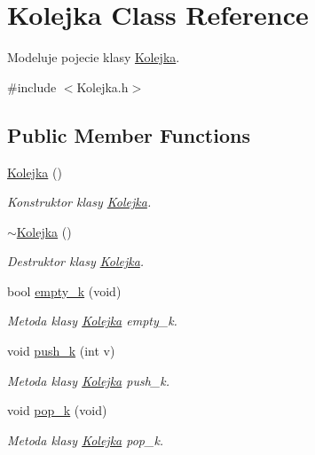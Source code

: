 \hypertarget{class_kolejka}{\section{Kolejka Class Reference}
\label{class_kolejka}
}


Modeluje pojecie klasy \hyperlink{class_kolejka}{Kolejka}.  




{\ttfamily \#include $<$Kolejka.\-h$>$}

\subsection*{Public Member Functions}
\begin{DoxyCompactItemize}
\item 
\hyperlink{class_kolejka_a37c886fdc73dce62b04da0381dec5484}{Kolejka} ()
\begin{DoxyCompactList}\small\item\em Konstruktor klasy \hyperlink{class_kolejka}{Kolejka}. \end{DoxyCompactList}\item 
\hyperlink{class_kolejka_a352f86ff08cd47be6c35c60bb0f873a6}{$\sim$\-Kolejka} ()
\begin{DoxyCompactList}\small\item\em Destruktor klasy \hyperlink{class_kolejka}{Kolejka}. \end{DoxyCompactList}\item 
bool \hyperlink{class_kolejka_a9a1de118b1444cf908563e703fcd2a9f}{empty\-\_\-k} (void)
\begin{DoxyCompactList}\small\item\em Metoda klasy \hyperlink{class_kolejka}{Kolejka} empty\-\_\-k. \end{DoxyCompactList}\item 
void \hyperlink{class_kolejka_a1e6b3e406bbc8fce1b26e1a1c2183d6c}{push\-\_\-k} (int v)
\begin{DoxyCompactList}\small\item\em Metoda klasy \hyperlink{class_kolejka}{Kolejka} push\-\_\-k. \end{DoxyCompactList}\item 
void \hyperlink{class_kolejka_aa46c2dc3468f3eaa67608196b51bc0df}{pop\-\_\-k} (void)
\begin{DoxyCompactList}\small\item\em Metoda klasy \hyperlink{class_kolejka}{Kolejka} pop\-\_\-k. \end{DoxyCompactList}\end{DoxyCompactItemize}



